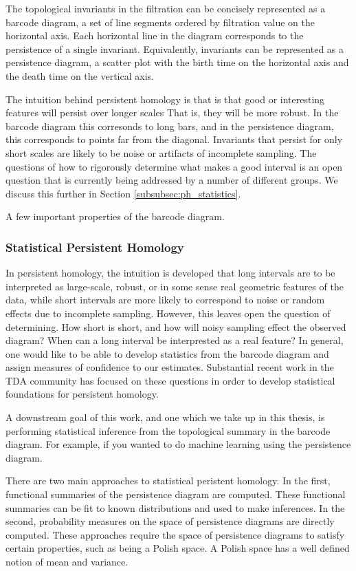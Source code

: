 The topological invariants in the filtration can be concisely represented as a barcode diagram, a set of line segments ordered by filtration value on the horizontal axis.
Each horizontal line in the diagram corresponds to the persistence of a single invariant.
Equivalently, invariants can be represented as a persistence diagram, a scatter plot with the birth time on the horizontal axis and the death time on the vertical axis.
\kje{[Figure.]}

The intuition behind persistent homology is that is that good or interesting features will persist over longer scales
That is, they will be more robust.
In the barcode diagram this corresonds to long bars, and in the persistence diagram, this corresponds to points far from the diagonal.
Invariants that persist for only short scales are likely to be noise or artifacts of incomplete sampling.
The questions of how to rigorously determine what makes a good interval is an open question that is currently being addressed by a number of different groups.
We discuss this further in Section \ref{subsubsec:ph_statistics}.

A few important properties of the barcode diagram.

\subsubsection{Statistical Persistent Homology}

In persistent homology, the intuition is developed that long intervals are to be interpreted as large-scale, robust, or in some sense real geometric features of the data, while short intervals are more likely to correspond to noise or random effects due to incomplete sampling.
However, this leaves open the question of determining.
How short is short, and how will noisy sampling effect the observed diagram?
When can a long interval be interprested as a real feature?
In general, one would like to be able to develop statistics from the barcode diagram and assign measures of confidence to our estimates.
Substantial recent work in the TDA community has focused on these questions in order to develop statistical foundations for persistent homology.

A downstream goal of this work, and one which we take up in this thesis, is performing statistical inference from the topological summary in the barcode diagram.
For example, if you wanted to do machine learning using the persistence diagram.

There are two main approaches to statistical peristent homology.
In the first, functional summaries of the persistence diagram are computed.
These functional summaries can be fit to known distributions and used to make inferences.
In the second, probability measures on the space of persistence diagrams are directly computed.
These approaches require the space of persistence diagrams to satisfy certain properties, such as being a Polish space.
A Polish space has a well defined notion of mean and variance.


